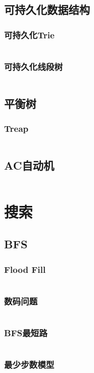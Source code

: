 \documentclass[a4paper,12pt]{article}
\begin{document}
\subsection{可持久化数据结构}
\subsubsection{可持久化Trie}
\inputminted[breaklines]{c++}{ds/last_trie.cc}
\subsubsection{可持久化线段树}
\inputminted[breaklines]{c++}{ds/last_seg.cc}
\subsection{平衡树}
\subsubsection{Treap}
\inputminted[breaklines]{c++}{ds/treap.cc}
\subsection{AC自动机}
\inputminted[breaklines]{c++}{ds/ac_auto.cc}


\newpage  
\section{搜索}
\subsection{BFS}
\subsubsection{Flood Fill}
\inputminted[breaklines]{c++}{search/bfs/flood.cc}
\subsubsection{数码问题}
\inputminted[breaklines]{c++}{search/bfs/shuma.cc}
\subsubsection{BFS最短路}
\inputminted[breaklines]{c++}{search/bfs/path.cc}
\subsubsection{最少步数模型}
\inputminted[breaklines]{c++}{search/bfs/min_step.cc}
\end{document}
